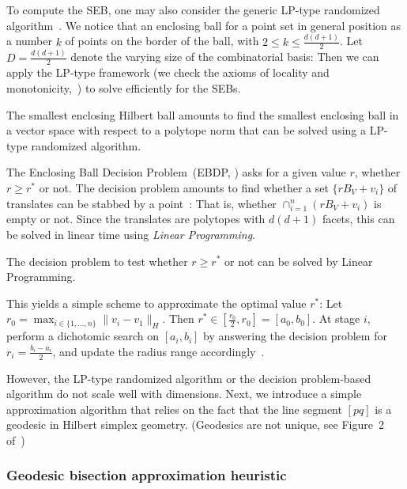 \documentclass[graybox]{svmult}
\begin{document}
To compute the SEB, one may also consider the generic LP-type randomized algorithm~\cite{SEBB-2008}.
We notice that an enclosing ball for a point set in general position as a number $k$ of points on the border of the ball, with $2\leq k\leq \frac{d(d+1)}{2}$.
Let $D=\frac{d(d+1)}{2}$ denote the varying size of the combinatorial basis: Then we can apply the LP-type framework (we check the axioms of locality and monotonicity,~\cite{LPtype-1992}) to solve efficiently for the SEBs. 


\begin{theorem}
The smallest enclosing Hilbert ball amounts to find the smallest enclosing ball in a vector space with respect to a polytope norm that can be solved using a LP-type randomized algorithm.
\end{theorem}

The Enclosing Ball Decision Problem~(EBDP, \cite{BallML-2009}) asks for a given value $r$, whether $r\geq r^*$ or not.
The decision problem amounts to find whether a set $\{rB_V+v_i\}$ of translates can be stabbed by a point~\cite{BallML-2009}:
That is, whether $\cap_{i=1}^n (rB_V+v_i)$ is empty or not. Since the translates are polytopes with $d(d+1)$ facets, this can be solved in linear time using
 {\em Linear Programming}. 

\begin{theorem}
The decision problem to test whether $r\geq r^*$ or not  can be solved by Linear Programming.
\end{theorem}

This yields a simple scheme to approximate the optimal value $r^*$: 
Let $r_0=\max_{i\in\{1,\ldots,n\}} \|v_i-v_1\|_H$. Then $r^*\in[\frac{r_0}{2},r_0]=[a_0,b_0]$.
At stage $i$, perform a dichotomic search on $[a_i,b_i]$ by answering the decision problem for $r_i=\frac{b_i-a_i}{2}$, and update the radius range accordingly~\cite{BallML-2009}.
 
However, the LP-type randomized algorithm or the decision problem-based algorithm do not scale well with dimensions.
Next, we introduce a simple approximation algorithm that relies on the fact that the line segment $[pq]$ is a geodesic in Hilbert simplex geometry.
(Geodesics are not unique, see Figure~2 of~\cite{HilbertHarpe-1991})

\subsubsection{Geodesic bisection approximation heuristic\label{sec:BCHSG}} 
\end{document}
